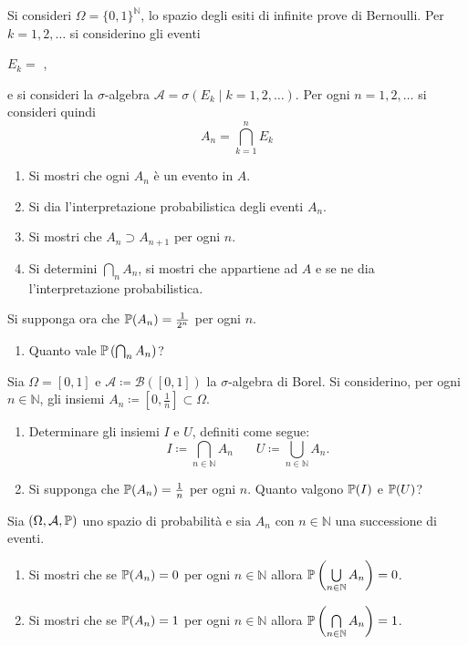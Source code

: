 \Esercizio{}

Si consideri $\Omega =\{0,1\}^{\mathbb{N}}$, lo spazio degli esiti di infinite prove di Bernoulli. Per $k=1,2,\dots $ si considerino gli eventi
\begin{center}
	$E_{k} =$ ,
\end{center}
e si consideri la $\sigma $-algebra $\mathcal{A} =\sigma (E_{k} \mid k=1,2,\dots)$. Per ogni $n=1,2,\dots $ si consideri quindi
\begin{equation*}
	A_{n} =\bigcap_{k=1}^{n} E_{k}
\end{equation*}
\begin{enumerate}
	\item Si mostri che ogni $A_{n}$ è un evento in $A$.
	\item Si dia l'interpretazione probabilistica degli eventi $A_{n}$.
	\item Si mostri che $A_{n} \supset A_{n+1}$ per ogni $n$.
	\item Si determini $\bigcap_{n} A_{n}$, si mostri che appartiene ad $A$ e se ne dia l'interpretazione probabilistica.
\end{enumerate}
Si supponga ora che $\mathbb{P}(A_{n}) =\frac{1}{2^{n}}$ per ogni $n$.
\begin{enumerate}[resume]
	\item Quanto vale $\mathbb{P}\left(\bigcap_{n} A_{n}\right)$?
\end{enumerate}

\Esercizio{}

Sia $\Omega =[0,1]$ e $\mathcal{A} \coloneqq \mathcal{B}([0,1])$ la $\sigma $-algebra di Borel. Si considerino, per ogni $n\in \mathbb{N}$, gli insiemi $A_{n} \coloneqq \left[0,\frac{1}{n}\right] \subset \Omega $.
\begin{enumerate}
	\item Determinare gli insiemi $I$ e $U$, definiti come segue:
	\begin{equation*}
		I\coloneqq \bigcap_{n\in \mathbb{N}} A_{n} \ \ \ \ \ \ \ \ U\coloneqq \bigcup_{n\in \mathbb{N}} A_{n} .
	\end{equation*}
	\item Si supponga che $\mathbb{P}(A_{n}) =\frac{1}{n}$ per ogni $n$. Quanto valgono $\mathbb{P}(I)$ e $\mathbb{P}(U)$?
\end{enumerate}

\Esercizio{$\star$}

Sia $(\Omega ,\mathcal{A} ,\mathbb{P})$ uno spazio di probabilità e sia $A_{n}$ con $n\in \mathbb{N}$ una successione di eventi.
\begin{enumerate}
	\item Si mostri che se $\mathbb{P}(A_{n}) =0$ per ogni $n\in \mathbb{N}$ allora $\mathbb{P}\left(\bigcup\limits_{n\in \mathbb{N}} A_{n}\right) =0$.
	\item Si mostri che se $\mathbb{P}(A_{n}) =1$ per ogni $n\in \mathbb{N}$ allora $\mathbb{P}\left(\bigcap\limits_{n\in \mathbb{N}} A_{n}\right) =1$.
\end{enumerate}

